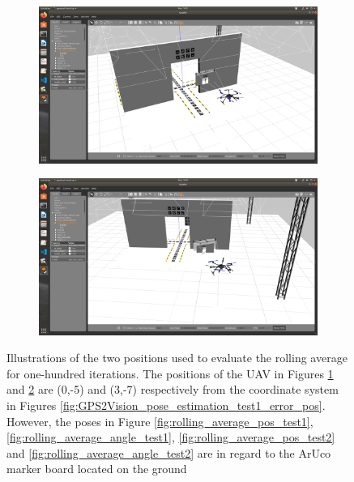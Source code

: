 \documentclass[../Head/report.tex]{subfiles}
\begin{document}
\begin{figure}[H]
    \centering
    \begin{subfigure}[t]{.30\textwidth}
        \centering
        \includegraphics[width=\textwidth]{../Figures/analyse_rolling_average/optimal_pose.png}
        \caption{}
        \label{fig:rolling_average_good_pos}
    \end{subfigure}
    \hspace{0.5em}
    \begin{subfigure}[t]{.30\textwidth}
        \centering
        \includegraphics[width=\textwidth]{../Figures/analyse_rolling_average/bad_pose.png}
        \caption{}
        \label{fig:rolling_average_bad_pos}
    \end{subfigure}
    \caption{Illustrations of the two positions used to evaluate the rolling average for one-hundred iterations. The positions of the UAV in Figures \ref{fig:rolling_average_good_pos} and \ref{fig:rolling_average_bad_pos} are (0,-5) and (3,-7) respectively from the coordinate system in Figures \ref{fig:GPS2Vision_pose_estimation_test1_error_pos}. However, the poses in Figure \ref{fig:rolling_average_pos_test1}, \ref{fig:rolling_average_angle_test1}, \ref{fig:rolling_average_pos_test2} and \ref{fig:rolling_average_angle_test2} are in regard to the ArUco marker board located on the ground} 
    \label{fig:rolling_average_pos}
\end{figure}
\end{document}
